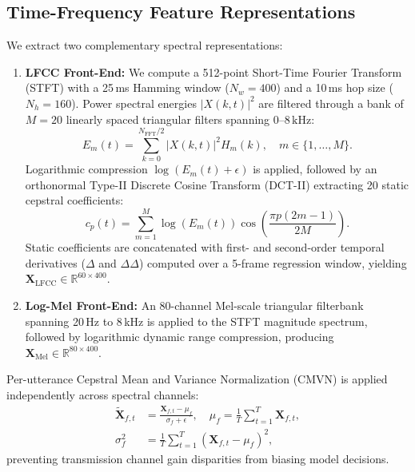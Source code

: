 \documentclass[conference]{IEEEtran}
\begin{document}
\subsection{Time-Frequency Feature Representations}
We extract two complementary spectral representations:
\begin{enumerate}
    \item \textbf{LFCC Front-End:} We compute a 512-point Short-Time Fourier Transform (STFT) with a 25\,ms Hamming window ($N_w = 400$) and a 10\,ms hop size ($N_h = 160$). Power spectral energies $|X(k, t)|^2$ are filtered through a bank of $M = 20$ linearly spaced triangular filters spanning $0\text{--}8\,\text{kHz}$:
    \begin{equation}
    E_m(t) = \sum_{k=0}^{N_{\text{FFT}}/2} |X(k, t)|^2 H_m(k), \quad m \in \{1,\dots,M\}.
    \end{equation}
    Logarithmic compression $\log(E_m(t) + \epsilon)$ is applied, followed by an orthonormal Type-II Discrete Cosine Transform (DCT-II) extracting 20 static cepstral coefficients:
    \begin{equation}
    c_p(t) = \sum_{m=1}^M \log(E_m(t)) \cos\left(\frac{\pi p (2m - 1)}{2M}\right).
    \end{equation}
    Static coefficients are concatenated with first- and second-order temporal derivatives ($\Delta$ and $\Delta\Delta$) computed over a 5-frame regression window, yielding $\mathbf{X}_{\text{LFCC}} \in \mathbb{R}^{60 \times 400}$.
    \item \textbf{Log-Mel Front-End:} An 80-channel Mel-scale triangular filterbank spanning 20\,Hz to 8\,kHz is applied to the STFT magnitude spectrum, followed by logarithmic dynamic range compression, producing $\mathbf{X}_{\text{Mel}} \in \mathbb{R}^{80 \times 400}$.
\end{enumerate}
Per-utterance Cepstral Mean and Variance Normalization (CMVN) is applied independently across spectral channels:
\begin{align}
\tilde{\mathbf{X}}_{f,t} &= \frac{\mathbf{X}_{f,t} - \mu_f}{\sigma_f + \epsilon}, \quad \mu_f = \frac{1}{T}\sum_{t=1}^T \mathbf{X}_{f,t}, \\
\sigma_f^2 &= \frac{1}{T}\sum_{t=1}^T (\mathbf{X}_{f,t} - \mu_f)^2,
\end{align}
preventing transmission channel gain disparities from biasing model decisions.
\end{document}
